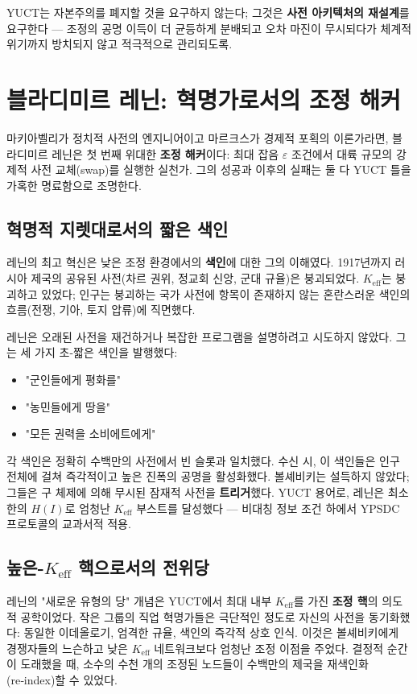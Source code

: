 \documentclass[12pt,a4paper]{article}
\newcommand{\Keff}{K_{\mathrm{eff}}}
\begin{document}
	YUCT는 자본주의를 폐지할 것을 요구하지 않는다; 그것은 \textbf{사전 아키텍처의 재설계}를 요구한다 — 조정의 공명 이득이 더 균등하게 분배되고 오차 마진이 무시되다가 체계적 위기까지 방치되지 않고 적극적으로 관리되도록.
	
	\section{블라디미르 레닌: 혁명가로서의 조정 해커}
	\label{sec:lenin}
	
	마키아벨리가 정치적 사전의 엔지니어이고 마르크스가 경제적 포획의 이론가라면, 블라디미르 레닌은 첫 번째 위대한 \textbf{조정 해커}이다: 최대 잡음 \(\varepsilon\) 조건에서 대륙 규모의 강제적 사전 교체(swap)를 실행한 실천가. 그의 성공과 이후의 실패는 둘 다 YUCT 틀을 가혹한 명료함으로 조명한다.
	
	\subsection{혁명적 지렛대로서의 짧은 색인}
	
	레닌의 최고 혁신은 낮은 조정 환경에서의 \textbf{색인}에 대한 그의 이해였다. 1917년까지 러시아 제국의 공유된 사전(차르 권위, 정교회 신앙, 군대 규율)은 붕괴되었다. \(\Keff\)는 붕괴하고 있었다; 인구는 붕괴하는 국가 사전에 항목이 존재하지 않는 혼란스러운 색인의 흐름(전쟁, 기아, 토지 압류)에 직면했다.
	
	레닌은 오래된 사전을 재건하거나 복잡한 프로그램을 설명하려고 시도하지 않았다. 그는 세 가지 초-짧은 색인을 발행했다:
	\begin{itemize}[leftmargin=*]
		\item "군인들에게 평화를"
		\item "농민들에게 땅을"
		\item "모든 권력을 소비에트에게"
	\end{itemize}
	각 색인은 정확히 수백만의 사전에서 빈 슬롯과 일치했다. 수신 시, 이 색인들은 인구 전체에 걸쳐 즉각적이고 높은 진폭의 공명을 활성화했다. 볼셰비키는 설득하지 않았다; 그들은 구 체제에 의해 무시된 잠재적 사전을 \textbf{트리거}했다. YUCT 용어로, 레닌은 최소한의 \(H(I)\)로 엄청난 \(K_{\mathrm{eff}}\) 부스트를 달성했다 — 비대칭 정보 조건 하에서 YPSDC 프로토콜의 교과서적 적용.
	
	\subsection{높은-\(K_{\mathrm{eff}}\) 핵으로서의 전위당}
	
	레닌의 "새로운 유형의 당" 개념은 YUCT에서 최대 내부 \(K_{\mathrm{eff}}\)를 가진 \textbf{조정 핵}의 의도적 공학이었다. 작은 그룹의 직업 혁명가들은 극단적인 정도로 자신의 사전을 동기화했다: 동일한 이데올로기, 엄격한 규율, 색인의 즉각적 상호 인식. 이것은 볼셰비키에게 경쟁자들의 느슨하고 낮은 \(K_{\mathrm{eff}}\) 네트워크보다 엄청난 조정 이점을 주었다. 결정적 순간이 도래했을 때, 소수의 수천 개의 조정된 노드들이 수백만의 제국을 재색인화(re‑index)할 수 있었다.
	
\end{document}
